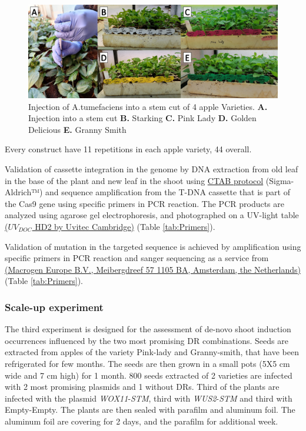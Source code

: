 \documentclass[
]{article}
\begin{document}
\begin{figure}[h]

{\centering \includegraphics[width=1\linewidth]{apple injection2} 

}

\caption{Injection of A.tumefaciens into a stem cut of 4 apple Varieties. \newline{} \textbf{A.} Injection into a stem cut \textbf{B.} Starking \textbf{C.} Pink Lady \textbf{D.} Golden Delicious \textbf{E.} Granny Smith}\label{fig:Agro-injection}
\end{figure}

Every construct have 11 repetitions in each apple variety, 44 overall.

Validation of cassette integration in the genome by DNA extraction from
old leaf in the base of the plant and new leaf in the shoot using
\href{https://www.sigmaaldrich.com/catalog/product/sigma/h6269?lang=en\&region=IL}{CTAB
protocol} (Sigma-Aldrich™) and sequence amplification from the T-DNA
cassette that is part of the Cas9 gene using specific primers in PCR
reaction. The PCR products are analyzed using agarose gel
electrophoresis, and photographed on a UV-light table
\href{https://topac.com/documents/geldoc_\%20catalogue.pdf}{(\(UV_{DOC}\)
HD2 by Uvitec Cambridge)} (Table \ref{tab:Primers}).

Validation of mutation in the targeted sequence is achieved by
amplification using specific primers in PCR reaction and sanger
sequencing as a service from
\href{https://dna.macrogen-europe.com/eng/index.jsp}{(Macrogen Europe
B.V., Meibergdreef 57 1105 BA, Amsterdam, the Netherlands)} (Table
\ref{tab:Primers}).

\hypertarget{scale-up-experiment}{%
\subsubsection{Scale-up experiment}\label{scale-up-experiment}}

The third experiment is designed for the assessment of de-novo shoot
induction occurrences influenced by the two most promising DR
combinations. Seeds are extracted from apples of the variety Pink-lady
and Granny-smith, that have been refrigerated for few months. The seeds
are then grown in a small pots (5X5 cm wide and 7 cm high) for 1 month.
800 seeds extracted of 2 varieties are infected with 2 most promising
plasmids and 1 without DRs. Third of the plants are infected with the
plasmid \emph{WOX11}-\emph{STM}, third with \emph{WUS2}-\emph{STM} and
third with Empty-Empty. The plants are then sealed with parafilm and
aluminum foil. The aluminum foil are covering for 2 days, and the
parafilm for additional week.
\end{document}
